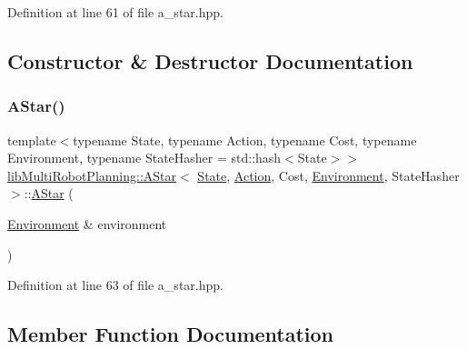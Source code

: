 Definition at line 61 of file a\+\_\+star.\+hpp.



\subsection{Constructor \& Destructor Documentation}
\mbox{\label{classlib_multi_robot_planning_1_1_a_star_a49f541dea7108ab1f3fe0b1f5004692b}} 
\subsubsection{\texorpdfstring{A\+Star()}{AStar()}}
{\footnotesize\ttfamily template$<$typename State, typename Action, typename Cost, typename Environment, typename State\+Hasher = std\+::hash$<$\+State$>$$>$ \\
\hyperlink{classlib_multi_robot_planning_1_1_a_star}{lib\+Multi\+Robot\+Planning\+::\+A\+Star}$<$ \hyperlink{structlib_multi_robot_planning_1_1_state}{State}, \hyperlink{namespacelib_multi_robot_planning_aba73fb71693f86a324adfa0e41e1053d}{Action}, Cost, \hyperlink{classlib_multi_robot_planning_1_1_environment}{Environment}, State\+Hasher $>$\+::\hyperlink{classlib_multi_robot_planning_1_1_a_star}{A\+Star} (\begin{DoxyParamCaption}\item[{\hyperlink{classlib_multi_robot_planning_1_1_environment}{Environment} \&}]{environment }\end{DoxyParamCaption})\hspace{0.3cm}{\ttfamily [inline]}}



Definition at line 63 of file a\+\_\+star.\+hpp.



\subsection{Member Function Documentation}
\mbox{\label{classlib_multi_robot_planning_1_1_a_star_acd703d42817f39d6027fa6432ca17ac9}} 
